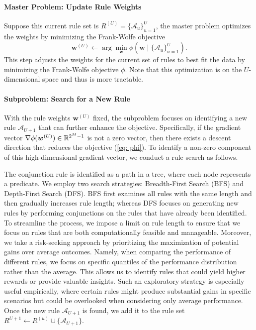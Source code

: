\documentclass{article} %
\begin{document}
\paragraph{Master Problem: Update Rule Weights} Suppose this current rule set is \( R^{(U)} = \{\mathcal{A}_u\}_{u=1}^U \), the master problem optimizes the weights by minimizing the Frank-Wolfe objective
   \[
   \boldsymbol{w}^{(U)} \gets \arg \min_{\boldsymbol{w}} \phi\left( \boldsymbol{w} \mid \{\mathcal{A}_u\}_{u=1}^U  \right).
   \]
 This step adjusts the weights for the current set of rules to best fit the data by minimizing the Frank-Wolfe objective \( \phi \). Note that this optimization is on the $U$-dimensional space and thus is more tractable.

\paragraph{Subproblem: Search for a New Rule} 
With the rule weights \( \boldsymbol{w}^{(U)} \) fixed, the subproblem focuses on identifying a new rule \( \mathcal{A}_{U+1} \)  that can further enhance the objective. Specifically, if the gradient vector $\nabla \phi(\boldsymbol{w}^{(U)}) \in \mathbb{R}^{2^M-1}$ is not a zero vector, then there exists a descent direction that reduces the objective (\ref{eq: phi}). To identify a non-zero component of this high-dimensional gradient vector, we conduct a rule search as follows.

The conjunction rule is identified as a path in a tree, where each node represents a predicate. We employ two search strategies: Breadth-First Search (BFS) and Depth-First Search (DFS). BFS first examines all rules with the same length and then gradually increases rule length; whereas DFS focuses on generating new rules by performing conjunctions on the rules that have already been identified. To streamline the process, we impose a limit on rule length to ensure that we focus on rules that are both computationally feasible and manageable. 
Moreover, we take a risk-seeking approach by prioritizing the maximization of potential gains over average outcomes. Namely, when comparing the performance of different rules, we focus on specific quantiles of the performance distribution rather than the average. This allows us to identify rules that could yield higher rewards or provide valuable insights. Such an exploratory strategy is especially useful empirically, where certain rules might produce substantial gains in specific scenarios but could be overlooked when considering only average performance.
Once the new rule \( \mathcal{A}_{U+1} \) is found, we add it to the rule set $R^{U+1} \gets R^{(u)} \cup \{ \mathcal{A}_{U+1} \}$.
  
\end{document}
